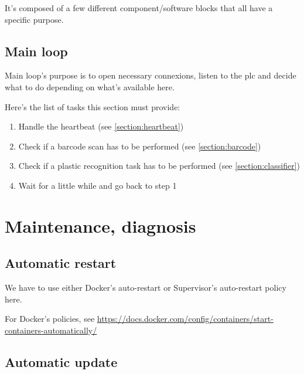 It's composed of a few different component/software blocks that all have a specific purpose.

\subsection{Main loop}

Main loop's purpose is to open necessary connexions, listen to the \gls{plc} and decide what to do depending on what's available here.

Here's the list of tasks this section must provide:

\begin{enumerate}
    \item Handle the \gls{heartbeat} (see \ref{section:heartbeat})
    \item Check if a barcode scan has to be performed (see \ref{section:barcode})
    \item Check if a plastic recognition task has to be performed (see \ref{section:classifier})
    \item Wait for a little while and go back to step 1
\end{enumerate}



\section{Maintenance, diagnosis}

\subsection{Automatic restart}


We have to use either Docker's auto-restart or Supervisor's auto-restart policy here.

For Docker's policies, see \url{https://docs.docker.com/config/containers/start-containers-automatically/}


\subsection{Automatic update}

